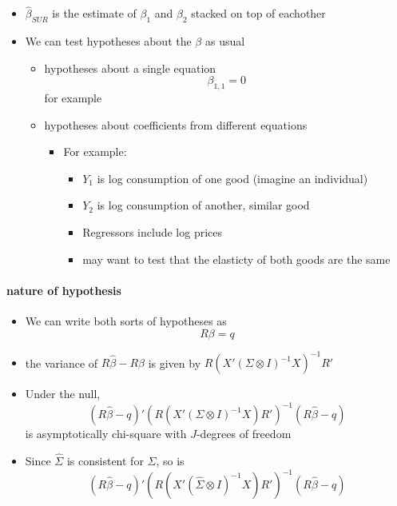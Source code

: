 \begin{itemize}
\item $\hat\beta_{SUR}$ is the estimate of $\beta_1$ and $\beta_2$
        stacked on top of eachother
\item We can test hypotheses about the $\beta$ as usual
\begin{itemize}
\item hypotheses about a single equation
          \[ \beta_{1,1} = 0 \]
          for example
\item hypotheses about coefficients from different equations
\begin{itemize}
\item For example:
\begin{itemize}
\item $Y_1$ is log consumption of one good (imagine an individual)
\item $Y_2$ is log consumption of another, similar good
\item Regressors include log prices
\item may want to test that the elasticty of both goods are
              the same
\end{itemize}
\end{itemize}
\end{itemize}
\end{itemize}
\paragraph{nature of hypothesis}
\label{sec-2-6-2}

\begin{itemize}
\item We can write both sorts of hypotheses as
        \[ R \beta = q \]
\item the variance of $R\hat\beta - R\beta$ is given by $R(X'(\Sigma
        \otimes I)^{-1}X)^{-1}R'$
\item Under the null, 
        \[(R\hat\beta - q)'\left(R(X'(\Sigma \otimes
        I)^{-1}X)R'\right)^{-1}(R\hat\beta - q)\] is asymptotically
        chi-square with $J$-degrees of freedom
\item Since $\hat\Sigma$ is consistent for $\Sigma$, so is
        \[(R\hat\beta - q)'\left(R(X'(\hat\Sigma \otimes
        I)^{-1}X)R'\right)^{-1}(R\hat\beta - q)\]
\end{itemize}

